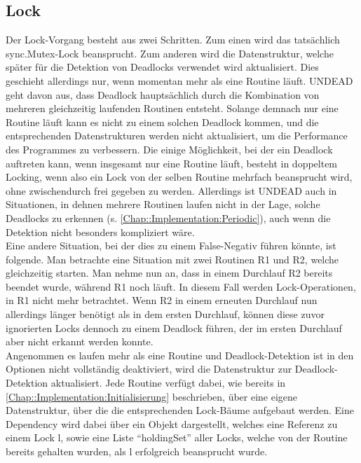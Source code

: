 \subsection{Lock}\label{Chap::Implementation:Logging.Lock}
Der Lock-Vorgang besteht aus zwei Schritten. Zum einen wird das tatsächlich
sync.Mutex-Lock beansprucht. Zum anderen wird die Datenstruktur, welche später 
für die Detektion von Deadlocks verwendet wird aktualisiert. Dies geschieht 
allerdings nur, wenn momentan mehr als eine Routine läuft. UNDEAD geht davon
aus, dass Deadlock hauptsächlich durch die Kombination von mehreren gleichzeitig
laufenden Routinen entsteht. Solange demnach nur eine Routine läuft kann es 
nicht zu einem solchen Deadlock kommen, und die entsprechenden Datenstrukturen 
werden nicht aktualisiert, um die Performance des Programmes zu verbessern.
Die einige Möglichkeit, bei der ein Deadlock auftreten kann, wenn insgesamt 
nur eine Routine läuft, besteht in doppeltem Locking, wenn also ein Lock 
von der selben Routine mehrfach beansprucht wird, ohne zwischendurch frei 
gegeben zu werden. Allerdings ist UNDEAD auch in Situationen, in dehnen 
mehrere Routinen laufen nicht in der Lage, solche Deadlocks zu erkennen (s. 
\ref{Chap::Implementation:Periodic}), 
auch wenn die Detektion nicht besonders kompliziert wäre.\\
Eine andere Situation, bei der dies zu einem False-Negativ führen könnte, ist 
folgende. Man betrachte eine Situation mit zwei Routinen R1 und R2, welche 
gleichzeitig starten. Man nehme nun an, dass in einem Durchlauf R2 bereits 
beendet wurde, während R1 noch läuft. In diesem Fall werden Lock-Operationen,
in R1 nicht mehr betrachtet. Wenn R2 in einem erneuten Durchlauf nun allerdings 
länger benötigt als in dem ersten Durchlauf, können diese zuvor ignorierten 
Locks dennoch zu einem Deadlock führen, der im ersten Durchlauf aber nicht
erkannt werden konnte.\\
Angenommen es laufen mehr als eine Routine und Deadlock-Detektion ist in den 
Optionen nicht vollständig deaktiviert, wird die Datenstruktur zur 
Deadlock-Detektion aktualisiert. Jede Routine verfügt dabei, wie bereits in 
\ref{Chap::Implementation:Initialisierung} beschrieben, über eine eigene 
Datenstruktur, über die die entsprechenden Lock-Bäume aufgebaut werden. 
Eine Dependency wird dabei über ein Objekt dargestellt, welches eine Referenz 
zu einem Lock l, sowie eine Liste  ``holdingSet'' aller Locks, welche von der 
Routine bereits 
gehalten wurden, als l erfolgreich beansprucht wurde.\\
